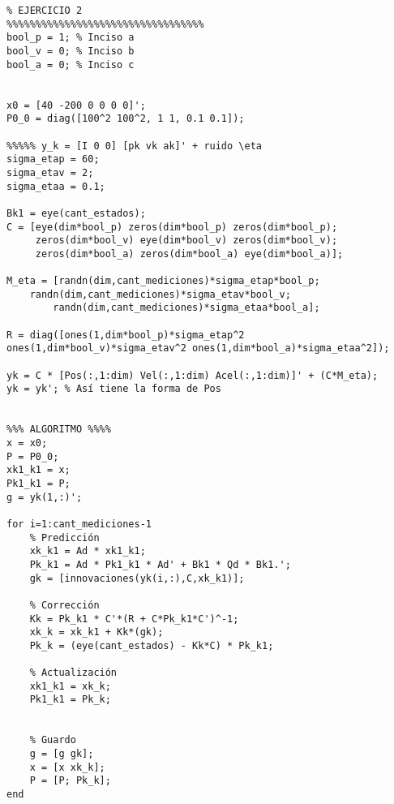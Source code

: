 
	\begin{lstlisting}[caption=\emph{Script} para la resolución del ejercicio 2]
%%%%%%%%%%%%%%%%%%%%%%%%%%%%%%%%%%
% EJERCICIO 2
%%%%%%%%%%%%%%%%%%%%%%%%%%%%%%%%%%
bool_p = 1;	% Inciso a
bool_v = 0;	% Inciso b
bool_a = 0;	% Inciso c


x0 = [40 -200 0 0 0 0]';
P0_0 = diag([100^2 100^2, 1 1, 0.1 0.1]);

%%%%% y_k = [I 0 0] [pk vk ak]' + ruido \eta
sigma_etap = 60;
sigma_etav = 2;
sigma_etaa = 0.1;

Bk1 = eye(cant_estados);
C =	[eye(dim*bool_p) zeros(dim*bool_p) zeros(dim*bool_p);
	 zeros(dim*bool_v) eye(dim*bool_v) zeros(dim*bool_v);
	 zeros(dim*bool_a) zeros(dim*bool_a) eye(dim*bool_a)];

M_eta = [randn(dim,cant_mediciones)*sigma_etap*bool_p; 
	randn(dim,cant_mediciones)*sigma_etav*bool_v;
       	randn(dim,cant_mediciones)*sigma_etaa*bool_a];

R = diag([ones(1,dim*bool_p)*sigma_etap^2 ones(1,dim*bool_v)*sigma_etav^2 ones(1,dim*bool_a)*sigma_etaa^2]);

yk = C * [Pos(:,1:dim) Vel(:,1:dim) Acel(:,1:dim)]' + (C*M_eta);
yk = yk'; % Así tiene la forma de Pos


%%% ALGORITMO %%%%
x = x0;
P = P0_0;
xk1_k1 = x;
Pk1_k1 = P;
g = yk(1,:)';

for i=1:cant_mediciones-1
	% Predicción
	xk_k1 = Ad * xk1_k1;
	Pk_k1 =	Ad * Pk1_k1 * Ad' + Bk1 * Qd * Bk1.';
	gk = [innovaciones(yk(i,:),C,xk_k1)];

	% Corrección
	Kk = Pk_k1 * C'*(R + C*Pk_k1*C')^-1;
	xk_k = xk_k1 + Kk*(gk);
	Pk_k = (eye(cant_estados) - Kk*C) * Pk_k1;
	
	% Actualización
	xk1_k1 = xk_k;
	Pk1_k1 = Pk_k;


	% Guardo
	g = [g gk];
	x = [x xk_k];
	P = [P; Pk_k];
end
	\end{lstlisting}




